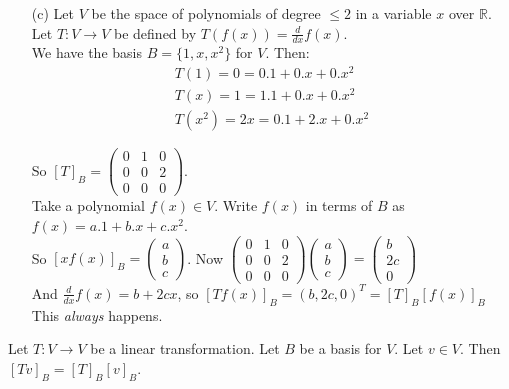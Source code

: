 \documentclass[10pt]{scrartcl}
\begin{document}
\begin{examples}
\begin{itemize}
\item[(c)] Let $V$ be the space of polynomials of degree $\leq 2$ in a variable $x$ over $\mathbb{R}$. Let $T: V \to V$ be defined by $T(f(x)) = \frac{d}{dx}f(x)$.\\

We have the basis $B = \{1,x,x^2\}$ for $V$. Then:
\[
\begin{aligned}
T(1) = 0 = 0.1 + 0.x + 0.x^2 \\
T(x) = 1 = 1.1 + 0.x + 0.x^2 \\
T(x^2) = 2x = 0.1 + 2.x + 0.x^2
\end{aligned}\]


So $[T]_B = \begin{pmatrix}
 0 & 1 & 0 \\ 0 & 0 & 2 \\ 0 & 0 & 0
 \end{pmatrix}$.\\
 
 Take a polynomial $f(x) \in V$. Write $f(x)$ in terms of $B$ as $f(x) = a.1 + b.x + c.x^2$.\\
 
 So $[xf(x)]_B = \begin{pmatrix}
 a \\ b \\ c
 \end{pmatrix}
$. Now $\begin{pmatrix}
 0 & 1 & 0 \\ 0 & 0 & 2 \\ 0 & 0 & 0

\end{pmatrix}\begin{pmatrix} 
a \\ b \\ c
\end{pmatrix} = \begin{pmatrix}
 b \\ 2c \\ 0
 \end{pmatrix}$\\
 
 And $\frac{d}{dx} f(x) = b + 2cx$, so $[Tf(x)]_B = (b, 2c, 0)^T = [T]_B[f(x)]_B$\\
 This \emph{always} happens. 
\end{itemize}
\end{examples}\vspace*{10pt}

\begin{proposition} Let $T: V \to V$ be a linear transformation. Let $B$ be a basis for $V$. Let $v \in V$. Then $[Tv]_B = [T]_B[v]_B$. 	
\end{proposition}
\end{document}
